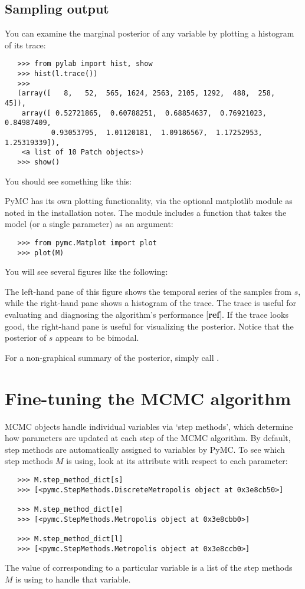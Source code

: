 \subsection*{Sampling output} 
You can examine the marginal posterior of any variable by plotting a histogram of its trace:
\begin{verbatim}
   >>> from pylab import hist, show
   >>> hist(l.trace())
   >>> 
   (array([   8,   52,  565, 1624, 2563, 2105, 1292,  488,  258,   45]),
    array([ 0.52721865,  0.60788251,  0.68854637,  0.76921023,  0.84987409,
           0.93053795,  1.01120181,  1.09186567,  1.17252953,  1.25319339]),
    <a list of 10 Patch objects>)
   >>> show()
\end{verbatim}
You should see something like this:
\begin{center}
\end{center}
PyMC has its own plotting functionality, via the optional matplotlib module as noted in the installation notes. The  module includes a  function that takes the model (or a single parameter) as an argument:
\begin{verbatim}
   >>> from pymc.Matplot import plot
   >>> plot(M)
\end{verbatim}
You will see several figures like the following:
\begin{center}
\end{center}
The left-hand pane of this figure shows the temporal series of the samples from $s$, while the right-hand pane shows a histogram of the trace. The trace is useful for evaluating and diagnosing the algorithm's performance [\textbf{ref}]. If the trace looks good, the right-hand pane is useful for visualizing the posterior. Notice that the posterior of $s$ appears to be bimodal.

For a non-graphical summary of the posterior, simply call .


\section*{Fine-tuning the MCMC algorithm} 

MCMC objects handle individual variables via `step methods', which determine how parameters are updated at each step of the MCMC algorithm. By default, step methods are automatically assigned to variables by PyMC. To see which step methods $M$ is using, look at its  attribute with respect to each parameter:
\begin{verbatim}
   >>> M.step_method_dict[s]
   >>> [<pymc.StepMethods.DiscreteMetropolis object at 0x3e8cb50>]
   
   >>> M.step_method_dict[e]
   >>> [<pymc.StepMethods.Metropolis object at 0x3e8cbb0>]

   >>> M.step_method_dict[l]
   >>> [<pymc.StepMethods.Metropolis object at 0x3e8ccb0>]
\end{verbatim}
The value of  corresponding to a particular variable is a list of the step methods $M$ is using to handle that variable. 


